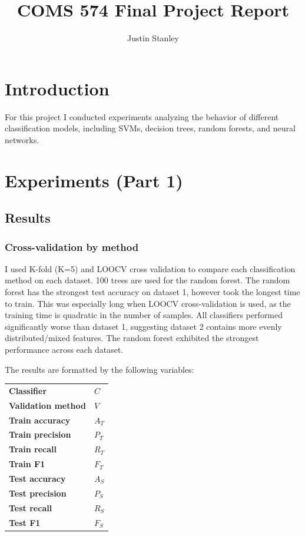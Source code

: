 \documentclass{article}
\begin{document}
\title{COMS 574 Final Project Report}
\author{Justin Stanley}

\maketitle

\section{Introduction}

For this project I conducted experiments analyzing the behavior of different classification models, including SVMs, decision trees, random forests, and neural networks.

\section{Experiments (Part 1)}

\subsection{Results}

\subsubsection{Cross-validation by method}

I used K-fold (K=5) and LOOCV cross validation to compare each classification method on each dataset. 100 trees are used for the random forest. The random forest has the strongest test accuracy on dataset 1, however took the longest time to train. This was especially long when LOOCV cross-validation is used, as the training time is quadratic in the number of samples. All classifiers performed significantly worse than dataset 1, suggesting dataset 2 contains more evenly distributed/mixed features. The random forest exhibited the strongest performance across each dataset.

The results are formatted by the following variables:
\begin{center}
    \begin{tabular}{l l}
        \textbf{Classifier} & $C$ \\
        \textbf{Validation method} & $V$ \\
        \textbf{Train accuracy} & $A_T$ \\
        \textbf{Train precision} & $P_T$ \\
        \textbf{Train recall} & $R_T$ \\
        \textbf{Train F1} & $F_T$ \\
        \textbf{Test accuracy} & $A_S$ \\
        \textbf{Test precision} & $P_S$ \\
        \textbf{Test recall} & $R_S$ \\
        \textbf{Test F1} & $F_S$ \\
    \end{tabular}
\end{center}
\end{document}
